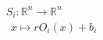 \documentclass[preview]{standalone}
\begin{document}
\begin{align*}
S_i : \mathbb{R}^n \to \mathbb{R}^n \\  \ \ x \mapsto r O_i(x) + b_i
\end{align*}
\end{document}
